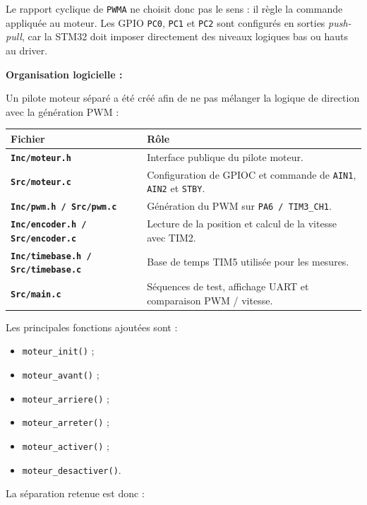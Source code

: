 \documentclass[11pt,a4paper]{article}
\begin{document}
\begin{sessionbox}
		Le rapport cyclique de \texttt{PWMA} ne choisit donc pas le sens : il règle la commande appliquée au moteur. Les GPIO \texttt{PC0}, \texttt{PC1} et \texttt{PC2} sont configurés en sorties \textit{push-pull}, car la STM32 doit imposer directement des niveaux logiques bas ou hauts au driver.
		
		\vspace{0.3cm}
		
		\textbf{Organisation logicielle :}
		
		Un pilote moteur séparé a été créé afin de ne pas mélanger la logique de direction avec la génération PWM :
		
		\begin{center}
			\begin{tabular}{>{\bfseries}p{4cm}p{9cm}}
				\toprule
				Fichier & Rôle \\
				\midrule
				\texttt{Inc/moteur.h} & Interface publique du pilote moteur. \\
				\texttt{Src/moteur.c} & Configuration de GPIOC et commande de \texttt{AIN1}, \texttt{AIN2} et \texttt{STBY}. \\
				\texttt{Inc/pwm.h / Src/pwm.c} & Génération du PWM sur \texttt{PA6 / TIM3\_CH1}. \\
				\texttt{Inc/encoder.h / Src/encoder.c} & Lecture de la position et calcul de la vitesse avec TIM2. \\
				\texttt{Inc/timebase.h / Src/timebase.c} & Base de temps TIM5 utilisée pour les mesures. \\
				\texttt{Src/main.c} & Séquences de test, affichage UART et comparaison PWM / vitesse. \\
				\bottomrule
			\end{tabular}
		\end{center}
		
		Les principales fonctions ajoutées sont :
		
		\begin{itemize}
			\item \texttt{moteur\_init()} ;
			\item \texttt{moteur\_avant()} ;
			\item \texttt{moteur\_arriere()} ;
			\item \texttt{moteur\_arreter()} ;
			\item \texttt{moteur\_activer()} ;
			\item \texttt{moteur\_desactiver()}.
		\end{itemize}
		
		La séparation retenue est donc :
		

\end{sessionbox}
\end{document}
